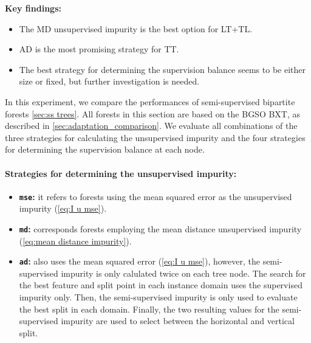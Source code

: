 \begin{mdframed}
    \textbf{Key findings:}
    \begin{itemize}
        \item The MD unsupervised impurity is the best option for LT+TL.
        \item AD is the most promising strategy for TT.
        \item The best strategy for determining the supervision balance seems to be either size or fixed, but further investigation is needed.
    \end{itemize}
\end{mdframed}

In this experiment, we compare the performances of semi-supervised bipartite forests \autoref{sec:ss trees}. All forests in this section are based on the BGSO BXT, as described in \autoref{sec:adaptation_comparison}. We evaluate all combinations of the three strategies for calculating the unsupervised impurity and the four strategies for determining the supervision balance at each node.

\paragraph*{Strategies for determining the unsupervised impurity:}
\begin{itemize}
    \item \textbf{\texttt{mse}:} it refers to forests using the mean squared error as the unsupervised impurity (\autoref{eq:I u mse}).
    \item \textbf{\texttt{md}:} corresponds forests employing the mean distance unsupervised impurity (\autoref{eq:mean distance impurity}).
    \item \textbf{\texttt{ad}:} also uses the mean squared error (\autoref{eq:I u mse}), however, the semi-supervised impurity is only calulated twice on each tree node. The search for the best feature and split point in each instance domain uses the supervised impurity only. Then, the semi-supervised impurity is only used to evaluate the best split in each domain. Finally, the two resulting values for the semi-supervised impurity are used to select between the horizontal and vertical split.
\end{itemize}

